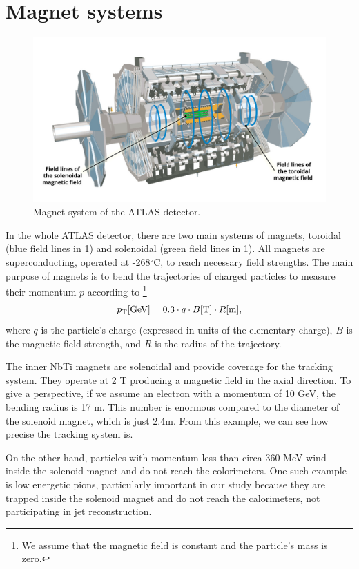 \section{Magnet systems}
\label{sec:magnet}
\begin{figure}[htb]
    \centering
    \includegraphics[width=1\linewidth]{src/img/magnet.jpg}
    \caption{Magnet system of the ATLAS detector.}
    \label{fig:magnet}
\end{figure}

In the whole ATLAS detector, there are two main systems of magnets, toroidal (blue field lines in \cref{fig:magnet}) and solenoidal (green field lines in \cref{fig:magnet}).
All magnets are superconducting, operated at -268$^\circ$C, to reach necessary field strengths.
The main purpose of magnets is to bend the trajectories of charged particles to measure their momentum $p$ according to \footnote{We assume that the magnetic field is constant and the particle's mass is zero.}
\begin{equation}
    \label{eq:magnet_momentum}
    p_\text{T} [\text{GeV}] = 0.3 \cdot q \cdot B [\text{T}] \cdot R [\text{m}],
\end{equation} 
where $q$ is the particle's charge (expressed in units of the elementary charge), $B$ is the magnetic field strength, and $R$ is the radius of the trajectory.

The inner NbTi magnets are solenoidal and provide coverage for the tracking system.
They operate at 2 T producing a magnetic field in the axial direction.
To give a perspective, if we assume an electron with a momentum of 10 GeV, the bending radius is 17 m.
This number is enormous compared to the diameter of the solenoid magnet, which is just 2.4m. 
From this example, we can see how precise the tracking system is.

On the other hand, particles with momentum less than circa 360 MeV wind inside the solenoid magnet and do not reach the colorimeters.
One such example is low energetic pions, particularly important in our study because they are trapped inside the solenoid magnet and do not reach the calorimeters, not participating in jet reconstruction.

